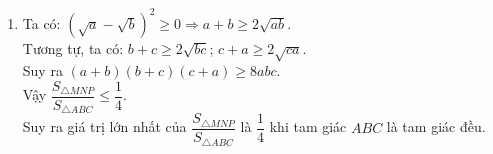 \begin{ex}
{\begin{enumerate}
			Suy ra $\dfrac{S_{\triangle MNP}}{S_{\triangle ABC}} = \dfrac{S_{\triangle ABC} - S_{\triangle ANP} - S_{\triangle CMN} - S_{\triangle BMP}}{\triangle ABC}$\\
			$= 1 - \dfrac{S_{\triangle ANP}}{S_{\triangle ABC}} - \dfrac{S_{\triangle CMN}}{S_{\triangle ABC}} - \dfrac{S_{\triangle BMP}}{S_{\triangle ABC}}$\\
			$= 1 - \dfrac{bc}{(a + b)(a + c)} - \dfrac{ca}{(b + c)(b + a)} - \dfrac{ab}{(c + a)(c + b)}$\\
			$= \dfrac{2abc}{(a + b)(b + c)(c + a)}$.
	\item Ta có: $\left(\sqrt{a} - \sqrt{b}\right)^2 \geq 0 \Rightarrow a + b \geq 2\sqrt{ab}$.\\
			Tương tự, ta có: $b + c \geq 2\sqrt{bc}$; $c + a \geq 2\sqrt{ca}$.\\
			Suy ra $(a + b)(b + c)(c + a) \geq 8abc$.\\
			Vậy $\dfrac{S_{\triangle MNP}}{S_{\triangle ABC}} \leq \dfrac{1}{4}$.\\
			Suy ra giá trị lớn nhất của $\dfrac{S_{\triangle MNP}}{S_{\triangle ABC}}$ là $\dfrac{1}{4}$ khi tam giác $ABC$ là tam giác đều.
\end{enumerate}
}
\end{ex}

